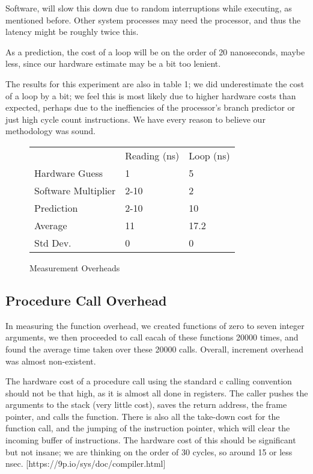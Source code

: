 \documentclass[letterpaper,twocolumn,10pt]{article}
\begin{document}
Software, will slow this down due to random interruptions while executing, as mentioned before.
Other system processes may need the processor, and thus the latency might be roughly twice 
this.

As a prediction, the cost of a loop will be on the order of 20 nanoseconds, maybe less, since
our hardware estimate may be a bit too lenient.

The results for this experiment are also in table 1; we did underestimate the cost of a loop by a bit;
we feel this is most likely due to higher hardware costs than expected, perhaps due to the ineffiencies
of the processor's branch predictor or just high cycle count instructions. We have every reason to believe our methodology was sound.

\begin{figure}
	\centering
    \begin{tabular}{lll}
      & Reading (ns) & Loop (ns) \\
Hardware Guess  & 1 & 5\\
Software Multiplier & 2-10 & 2 \\
Prediction & 2-10 & 10\\
Average  & 11 & 17.2 \\
Std Dev. & 0 & 0
\end{tabular}
\caption{Measurement Overheads}
\label{tab:generaloverheads}
\end{figure}


\subsection{Procedure Call Overhead}

In measuring the function overhead, we created functions of zero to seven integer arguments,
we then proceeded to call eacah of these functions 20000 times, and found the average time taken over these 20000 calls. Overall, increment overhead was almost non-existent.

The hardware cost of a procedure call using the standard c calling convention should not be that high, as it is almost all done in registers. The caller pushes the arguments to the stack (very little cost), saves the return address, the frame pointer, and calls the function. There is also all the take-down cost for the function call, and the jumping of the instruction pointer, which will clear the incoming buffer of instructions. The hardware cost of this should be significant but not insane; we
are thinking on the order of 30 cycles, so around 15 or less nsec.
[https://9p.io/sys/doc/compiler.html]
\end{document}
